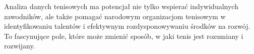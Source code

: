 \documentclass[12pt, a4paper]{article}
\begin{document}
Analiza danych tenisowych ma potencjał nie tylko wspierać indywidualnych zawodników, ale także pomagać narodowym organizacjom tenisowym w identyfikowaniu talentów i efektywnym rozdysponowywaniu środków na rozwój. To fascynujące pole, które może zmienić sposób, w jaki tenis jest rozumiany i rozwijany. 







\end{document}
